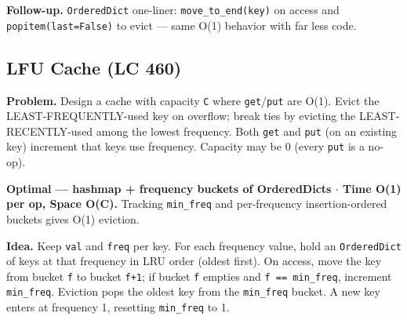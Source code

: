 \documentclass[11pt]{article}
\begin{document}
\textbf{Follow-up.} \texttt{OrderedDict} one-liner: \texttt{move\_to\_end(key)} on access and \texttt{popitem(last=False)} to evict --- same O(1) behavior with far less code.

\subsection{LFU Cache (LC 460)}\label{lfu-cache-lc-460}

\textbf{Problem.} Design a cache with capacity \texttt{C} where \texttt{get}/\texttt{put} are O(1). Evict the LEAST-FREQUENTLY-used key on overflow; break ties by evicting the LEAST-RECENTLY-used among the lowest frequency. Both \texttt{get} and \texttt{put} (on an existing key) increment that key\textquotesingle s use frequency. Capacity may be 0 (every \texttt{put} is a no-op).

\textbf{Optimal --- hashmap + frequency buckets of OrderedDicts \(\cdot\) Time O(1) per op, Space O(C).} Tracking \texttt{min\_freq} and per-frequency insertion-ordered buckets gives O(1) eviction.

\textbf{Idea.} Keep \texttt{val} and \texttt{freq} per key. For each frequency value, hold an \texttt{OrderedDict} of keys at that frequency in LRU order (oldest first). On access, move the key from bucket \texttt{f} to bucket \texttt{f+1}; if bucket \texttt{f} empties and \texttt{f\ ==\ min\_freq}, increment \texttt{min\_freq}. Eviction pops the oldest key from the \texttt{min\_freq} bucket. A new key enters at frequency 1, resetting \texttt{min\_freq} to 1.

\end{document}
